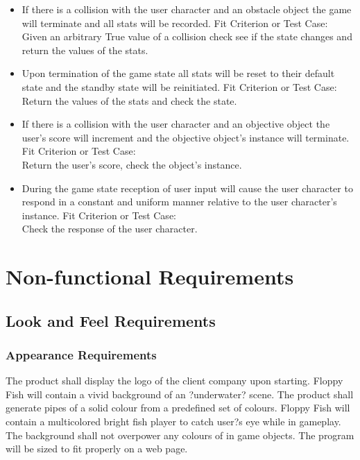 \documentclass[11pt, oneside]{article}   	%
\begin{document}
\begin{itemize}
\item
If there is a collision with the user character and an obstacle object the game will terminate and all stats will be recorded.
\subitem
Fit Criterion or Test Case: \\
Given an arbitrary True value of a collision check see if the state changes and return the values of the stats.

\item
Upon termination of the game state all stats will be reset to their default state and the standby state will be reinitiated.
\subitem
Fit Criterion or Test Case: \\
Return the values of the stats and check the state.

\item
If there is a collision with the user character and an objective object the user's score will increment and the objective object's instance will terminate.
\subitem
Fit Criterion or Test Case: \\
Return the user's score, check the object's instance.

\item
During the game state reception of user input will cause the user character to respond in a constant and uniform manner relative to the user character's instance.
\subitem
Fit Criterion or Test Case: \\
Check the response of the user character.

\end{itemize}

\newpage
\section*{Non-functional Requirements}
\subsection*{Look and Feel Requirements}
\subsubsection*{Appearance Requirements}
The product shall display the logo of the client company upon starting. Floppy Fish will contain a vivid background of an ?underwater? scene. The product shall generate pipes of a solid colour from a predefined set of colours. Floppy Fish will contain a multicolored bright fish player to catch user?s eye while in gameplay. The background shall not overpower any colours of in game objects. The program will be sized to fit properly on a web page.
\end{document}

